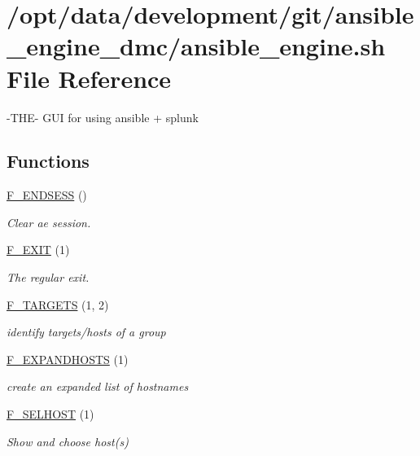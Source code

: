 \hypertarget{ansible__engine_8sh}{}\section{/opt/data/development/git/ansible\+\_\+engine\+\_\+dmc/ansible\+\_\+engine.sh File Reference}
\label{ansible__engine_8sh}


-\/\+T\+H\+E-\/ G\+UI for using ansible + splunk  


\subsection*{Functions}
\begin{DoxyCompactItemize}
\item 
\mbox{\hyperlink{ansible__engine_8sh_ae32aed87711d2842d25199eda0b2726e}{F\+\_\+\+E\+N\+D\+S\+E\+SS}} ()
\begin{DoxyCompactList}\small\item\em Clear ae session. \end{DoxyCompactList}\item 
\mbox{\hyperlink{ansible__engine_8sh_a66ec6201aeab8fa5ad0064b93bd4850c}{F\+\_\+\+E\+X\+IT}} (1)
\begin{DoxyCompactList}\small\item\em The regular exit. \end{DoxyCompactList}\item 
\mbox{\hyperlink{ansible__engine_8sh_a11be079619b38fc891171796f6434bcb}{F\+\_\+\+T\+A\+R\+G\+E\+TS}} (1, 2)
\begin{DoxyCompactList}\small\item\em identify targets/hosts of a group \end{DoxyCompactList}\item 
\mbox{\hyperlink{ansible__engine_8sh_a8233577ab4c7a9a7be584c90aea71749}{F\+\_\+\+E\+X\+P\+A\+N\+D\+H\+O\+S\+TS}} (1)
\begin{DoxyCompactList}\small\item\em create an expanded list of hostnames \end{DoxyCompactList}\item 
\mbox{\hyperlink{ansible__engine_8sh_a8012bbe8c3a9244ff76f4000e67f191a}{F\+\_\+\+S\+E\+L\+H\+O\+ST}} (1)
\begin{DoxyCompactList}\small\item\em Show and choose host(s) \end{DoxyCompactList}\item 

\end{DoxyCompactItemize}
